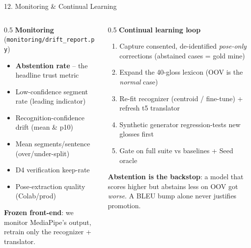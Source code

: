 \documentclass[10pt,aspectratio=169]{beamer}
\begin{document}
\begin{frame}{12. Monitoring \& Continual Learning}
\begin{columns}[T]
\begin{column}{0.5\textwidth}
\textbf{Monitoring} (\texttt{monitoring/drift\_report.py})
\begin{itemize}\small
  \item \textbf{Abstention rate} -- the headline trust metric
  \item Low-confidence segment rate (leading indicator)
  \item Recognition-confidence drift (mean \& p10)
  \item Mean segments/sentence (over/under-split)
  \item D4 verification keep-rate
  \item Pose-extraction quality (Colab/prod)
\end{itemize}
\textbf{Frozen front-end}: we monitor MediaPipe's output, retrain only the recognizer + translator.
\end{column}
\begin{column}{0.5\textwidth}
\textbf{Continual learning loop}
\begin{enumerate}\small
  \item Capture consented, de-identified \emph{pose-only} corrections (abstained cases = gold mine)
  \item Expand the 40-gloss lexicon (OOV is the \emph{normal} case)
  \item Re-fit recognizer (centroid / fine-tune) + refresh t5 translator
  \item Synthetic generator regression-tests new glosses first
  \item Gate on full suite vs baselines + Seed oracle
\end{enumerate}
\scriptsize \textbf{Abstention is the backstop}: a model that scores higher but abstains less on OOV got \emph{worse}. A BLEU bump alone never justifies promotion.
\end{column}
\end{columns}
\end{frame}
\end{document}
